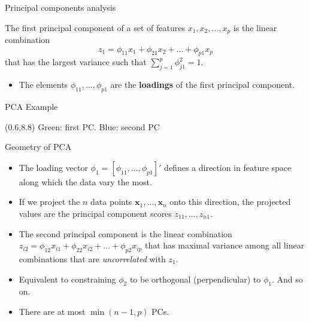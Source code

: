 \documentclass[14pt]{beamer}
\begin{document}
\begin{frame}{Principal components analysis}

\begin{alertblock}{}
The first principal component of a set of features $x_1, x_2, \dots, x_p$ is the linear combination
\[
z_1 = \phi_{11}x_1 + \phi_{21} x_2 + \dots + \phi_{p1} x_p
\]
that has the largest variance such that  $\displaystyle\sum_{j=1}^p \phi^2_{j1} = 1$.
\end{alertblock} 

\begin{itemize}

\item The elements $\phi_{11},\dots,\phi_{p1}$ are the \textbf{loadings} of the first principal component.
\end{itemize}
\end{frame}

\begin{frame}{PCA Example}


\begin{textblock}{12}(0.6,8.8)
\textcolor[RGB]{0,159,134}{Green: first PC.}\qquad 
\textcolor[RGB]{0,114,203}{Blue: second PC}
\end{textblock}
\end{frame}



\begin{frame}{Geometry of PCA}\vspace*{-0.2cm}
\begin{itemize}
\item The loading vector $\phi_1 = [\phi_{11},\dots,\phi_{p1}]'$
defines a direction in feature space along which the data
vary the most.
\item If we project the $n$ data points $\bm{x}_1,\dots,\bm{x}_n$ onto this
direction, the projected values are the principal component
scores $z_{11},\dots,z_{n1}$.

\item The second principal component is the linear combination $z_{i2} = \phi_{12}x_{i1} + \phi_{22}x_{i2} + \dots + \phi_{p2}x_{ip}$ that has maximal variance among all linear
combinations that are \emph{uncorrelated} with $z_1$.
\item Equivalent to constraining $\phi_2$ to be orthogonal (perpendicular) to $\phi_1$. And so on.
\item  There are at most $\min(n - 1, p)$ PCs.
\end{itemize}

\end{frame}
\end{document}
